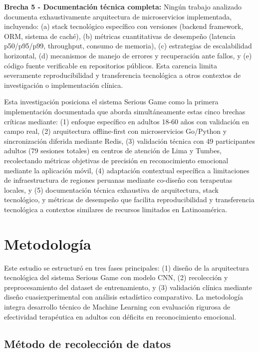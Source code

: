 \documentclass[journal,article,submit,pdftex,moreauthors]{Definitions/mdpi}
\begin{document}
	\textbf{Brecha 5 - Documentación técnica completa:} Ningún trabajo analizado documenta exhaustivamente arquitectura de microservicios implementada, incluyendo: (a) stack tecnológico específico con versiones (backend framework, ORM, sistema de caché), (b) métricas cuantitativas de desempeño (latencia p50/p95/p99, throughput, consumo de memoria), (c) estrategias de escalabilidad horizontal, (d) mecanismos de manejo de errores y recuperación ante fallos, y (e) código fuente verificable en repositorios públicos. Esta carencia limita severamente reproducibilidad y transferencia tecnológica a otros contextos de investigación o implementación clínica.
	
	Esta investigación posiciona el sistema Serious Game como la primera implementación documentada que aborda simultáneamente estas cinco brechas críticas mediante: (1) enfoque específico en adultos 18-60 años con validación en campo real, (2) arquitectura offline-first con microservicios Go/Python y sincronización diferida mediante Redis, (3) validación técnica con 49 participantes adultos (79 sesiones totales) en centros de atención de Lima y Tumbes, recolectando métricas objetivas de precisión en reconocimiento emocional mediante la aplicación móvil, (4) adaptación contextual específica a limitaciones de infraestructura de regiones peruanas mediante co-diseño con terapeutas locales, y (5) documentación técnica exhaustiva de arquitectura, stack tecnológico, y métricas de desempeño que facilita reproducibilidad y transferencia tecnológica a contextos similares de recursos limitados en Latinoamérica.
	
	\section{Metodología}
	
	Este estudio se estructuró en tres fases principales: (1) diseño de la arquitectura tecnológica del sistema Serious Game con modelo CNN, (2) recolección y preprocesamiento del dataset de entrenamiento, y (3) validación clínica mediante diseño cuasiexperimental con análisis estadístico comparativo. La metodología integra desarrollo técnico de Machine Learning con evaluación rigurosa de efectividad terapéutica en adultos con déficits en reconocimiento emocional.
	
	\subsection{Método de recolección de datos}
	
\end{document}
